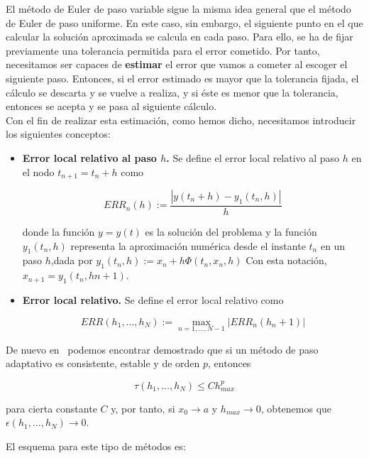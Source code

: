 El método de Euler de paso variable sigue la misma idea general que el método de
Euler de paso uniforme. En este caso, sin embargo, el siguiente punto en el que
calcular la solución aproximada se calcula en cada paso. Para ello, se ha de
fijar previamente una tolerancia permitida para el error cometido. Por tanto,
necesitamos ser capaces de \textbf{estimar} el error que vamos a cometer al
escoger el siguiente paso. Entonces, si el error estimado es mayor que la
tolerancia fijada, el cálculo se descarta y se vuelve a realiza, y si éste es
menor que la tolerancia, entonces se acepta y se pasa al siguiente cálculo.\\

Con el fin de realizar esta estimación, como hemos dicho, necesitamos introducir
los siguientes conceptos:

\begin{itemize}

		\item \textbf{Error local relativo al paso $h$.} Se define el error local relativo
				al paso $h$ en el nodo $t_{n+1} = t_n + h$ como 

				\begin{equation}
						ERR_n(h) := \frac{|y(t_n + h) - y_1(t_n,h)|}{h}	
				\end{equation}

				donde la función $y = y(t)$ es la solución del problema y la
				función $y_1(t_n,h)$ representa la aproximación numérica desde
				el instante $t_n$ en un paso $h$,dada por $y_1(t_n,h) :=  x_n +
				h\Phi (t_n,x_n,h)$ Con esta notación, $x_{n+1} = y_1(t_n,hn+1)$.

		\item \textbf{Error local relativo.} Se define el error local relativo
				como 

				\begin{equation}
						ERR(h_1,\ldots,h_N):=\max_{n=1,\ldots,N-1}|ERR_n(h_n+1)|	
				\end{equation}

\end{itemize}

De nuevo en~\citet{ANNU} podemos encontrar demostrado que si un método de paso
adaptativo es consistente, estable y de orden $p$, entonces

\[\tau(h_1,\ldots,h_N) \le Ch_{max}^p\]

para cierta constante $C$ y, por tanto, si $x_0\to a$ y $h_{max}\to 0$, obtenemos que $\epsilon(h_1,\ldots,h_N)\to 0$.

El esquema para este tipo de métodos es:

